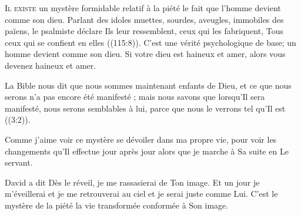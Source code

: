 


\lettrine{I}{l existe} un mystère formidable relatif à la piété
 \ocadr le fait que l'homme devient comme son dieu.
 Parlant des idoles muettes, sourdes, aveugles, immobiles des païens,
 le psalmiste déclare\frcolon{} 
 \Og Ils leur ressemblent, ceux qui les fabriquent,
 Tous ceux qui se confient en elles \Fg{} ((115:8)).
 C'est une vérité psychologique de base;
 un homme devient comme son dieu.
 Si votre dieu est haineux et amer, alors vous devenez haineux et amer.


La Bible nous dit que \Og nous 
 sommes maintenant enfants de Dieu, et ce que nous serons n'a pas encore
 été manifesté ; mais nous savons que lorsqu'Il sera manifesté,
 nous serons semblables à lui, parce que nous le verrons
 tel qu'Il est \Fg{} ((3:2)).

Comme j'aime voir ce mystère se dévoiler dans ma propre vie,
 pour voir les changements qu'Il effectue jour après jour
 alors que je marche à Sa suite en Le servant.

David a dit\frcolon{} 
 \Og Dès le réveil, je me rassasierai de Ton image. \Fg{}
 Et un jour je m'éveillerai et je me retrouverai au ciel
 et je serai juste comme Lui. C'est le mystère de la piété\frcolon{}
 la vie transformée conformée à Son image.

\dvrule







